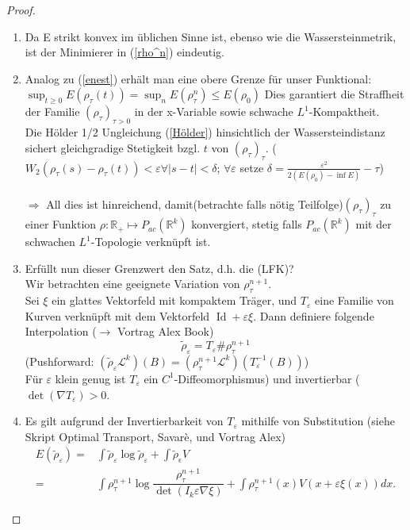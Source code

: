 \documentclass[11pt,a4paper,notitlepage]{scrreprt}
\newcommand{\RR}{\mathbb{R}}
\begin{document}
\begin{proof}
\begin{enumerate}
\item Da E strikt konvex im üblichen Sinne ist, ebenso wie die Wassersteinmetrik, ist der Minimierer in (\ref{rho^n})  eindeutig. 
\item Analog zu (\ref{enest}) erhält man eine obere Grenze für unser Funktional: $\sup_{t\geq 0} E(\rho_\tau(t))=\sup_n E(\rho_\tau^n)\leq E(\rho_0)$
Dies garantiert die Straffheit der Familie $(\rho_\tau)_{\tau >0}$ in der x-Variable sowie schwache $L^1$-Kompaktheit.\\
Die Hölder 1/2 Ungleichung (\ref{Hölder}) hinsichtlich der Wassersteindistanz sichert gleichgradige Stetigkeit bzgl. $t$ von $(\rho_\tau)_\tau$. ($W_2(\rho_\tau(s)-\rho_\tau(t))<\varepsilon \forall \vert s-t\vert<\delta$; $\forall \varepsilon$ setze $\delta=\frac{\varepsilon^2}{2(E(\rho_0)-\inf E)}-\tau$)\\\\
$\Rightarrow$ All dies ist hinreichend, damit(betrachte falls nötig Teilfolge)$(\rho_\tau)_\tau$ zu einer Funktion $\rho: \RR_+ \mapsto P_{ac}(\RR^k)$ konvergiert, stetig falls $P_{ac}(\RR^k)$ mit der schwachen $L^1$-Topologie verknüpft ist. \\
\item Erfüllt nun dieser Grenzwert den Satz, d.h. die (LFK)? \\
Wir betrachten eine geeignete Variation von $\rho_\tau^{n+1}$.\\
Sei $\xi$ ein glattes Vektorfeld mit kompaktem Träger, und $T_\varepsilon$ eine Familie von Kurven verknüpft mit dem Vektorfeld $\operatorname{Id} +\varepsilon\xi$. Dann definiere folgende Interpolation ($\rightarrow$ Vortrag Alex Book)
\[\tilde{\rho}_\varepsilon=T_\varepsilon \#\rho_\tau^{n+1} \]
(Pushforward: $(\tilde{\rho}_\varepsilon \mathcal{L}^k)(B)=(\rho_\tau^{n+1}\mathcal{L}^k)(T_\varepsilon^{-1}(B))$)\\
Für $\varepsilon$ klein genug ist $T_\varepsilon$ ein $C^1$-Diffeomorphismus) und invertierbar ($\det(\nabla T_\varepsilon)>0$.\\
\item Es gilt aufgrund der Invertierbarkeit von $T_\varepsilon$ mithilfe von Substitution (siehe Skript Optimal Transport, Savarè, und Vortrag Alex)  
\begin{align}
E(\tilde{\rho}_\varepsilon)=&\int\tilde{\rho}_\varepsilon\log\tilde{\rho}_\varepsilon+\int\tilde{\rho}_\epsilon V\\
=&\int \rho_\tau^{n+1}\log\dfrac{\rho_\tau^{n+1}}{\det(I_k\varepsilon \nabla \xi)}+\int \rho_\tau^{n+1}(x)V(x+\varepsilon\xi(x))dx.

\end{align}
\end{enumerate}
\end{proof}
\end{document}
